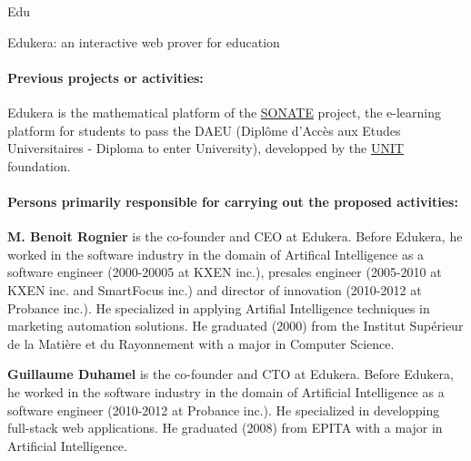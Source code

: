 \begin{sitedescription}{Edu}
\begin{compactitem}
    \item Edukera: an interactive web prover for education
\end{compactitem}

\paragraph*{Previous projects or activities:}

\begin{compactitem}
\item Edukera is the mathematical platform of the \hyperlink{https://daeu-sonate.fr/}{SONATE} project, the e-learning platform for
students to pass the DAEU (Diplôme d'Accès aux Etudes Universitaires - Diploma to enter University), developped by the \hyperlink{http://www.unit.eu/}{UNIT} foundation.
\end{compactitem}


\paragraph*{Persons primarily responsible for carrying out the proposed activities:}

\begin{compactitem} %
\item{\bf M. Benoit Rognier} is the co-founder and CEO at Edukera.
Before Edukera, he worked in the software industry in the domain of Artifical Intelligence
as a software engineer (2000-20005 at KXEN inc.), presales engineer (2005-2010 at KXEN inc.
and SmartFocus inc.) and director of innovation (2010-2012 at Probance inc.).
He specialized in applying Artifial Intelligence techniques in marketing automation solutions.
He graduated (2000) from the Institut Supérieur de la Matière et du Rayonnement
with a major in Computer Science.

\item{\bf Guillaume Duhamel} is the co-founder and CTO at Edukera.
Before Edukera, he worked in the software industry in the domain of Artificial Intelligence
as a software engineer (2010-2012 at Probance inc.). He specialized in developping full-stack web applications.
He graduated (2008) from EPITA with a major in Artificial Intelligence.
\end{compactitem}

\end{sitedescription}

